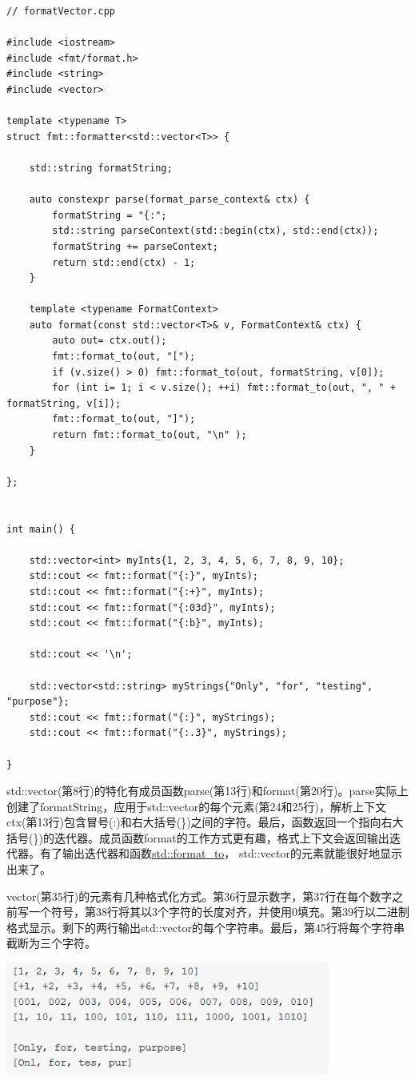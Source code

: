\begin{lstlisting}[style=styleCXX]
// formatVector.cpp

#include <iostream>
#include <fmt/format.h>
#include <string>
#include <vector>

template <typename T>
struct fmt::formatter<std::vector<T>> {

	std::string formatString;
	
	auto constexpr parse(format_parse_context& ctx) {
		formatString = "{:";
		std::string parseContext(std::begin(ctx), std::end(ctx));
		formatString += parseContext;
		return std::end(ctx) - 1;
	}
	
	template <typename FormatContext>
	auto format(const std::vector<T>& v, FormatContext& ctx) {
		auto out= ctx.out();
		fmt::format_to(out, "[");
		if (v.size() > 0) fmt::format_to(out, formatString, v[0]);
		for (int i= 1; i < v.size(); ++i) fmt::format_to(out, ", " + formatString, v[i]);
		fmt::format_to(out, "]");
		return fmt::format_to(out, "\n" );
	}

};


int main() {

	std::vector<int> myInts{1, 2, 3, 4, 5, 6, 7, 8, 9, 10};
	std::cout << fmt::format("{:}", myInts);
	std::cout << fmt::format("{:+}", myInts);
	std::cout << fmt::format("{:03d}", myInts);
	std::cout << fmt::format("{:b}", myInts);
	
	std::cout << '\n';
	
	std::vector<std::string> myStrings{"Only", "for", "testing", "purpose"};
	std::cout << fmt::format("{:}", myStrings);
	std::cout << fmt::format("{:.3}", myStrings);

}
\end{lstlisting}

std::vector(第8行)的特化有成员函数parse(第13行)和format(第20行)。parse实际上创建了formatString，应用于std::vector的每个元素(第24和25行)，解析上下文ctx(第13行)包含冒号(:)和右大括号(\})之间的字符。最后，函数返回一个指向右大括号(\})的迭代器。成员函数format的工作方式更有趣，格式上下文会返回输出迭代器。有了输出迭代器和函数\href{https://en.cppreference.com/w/cpp/utility/format/format_to}{std::format\_to}， std::vector的元素就能很好地显示出来了。

vector(第35行)的元素有几种格式化方式。第36行显示数字，第37行在每个数字之前写一个符号，第38行将其以3个字符的长度对齐，并使用0填充。第39行以二进制格式显示。剩下的两行输出std::vector的每个字符串。最后，第45行将每个字符串截断为三个字符。

\begin{center}
\includegraphics[width=0.8\textwidth]{content/3/chapter5/images/1-8.png}\\
\end{center}

